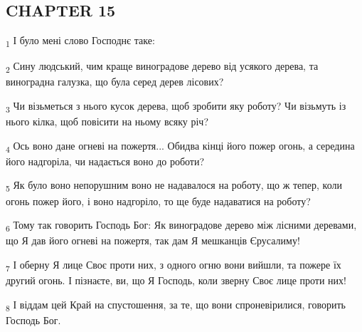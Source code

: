 \subsection{CHAPTER 15}
\begin{tcolorbox}
\textsubscript{1} І було мені слово Господнє таке:
\end{tcolorbox}
\begin{tcolorbox}
\textsubscript{2} Сину людський, чим краще виноградове дерево від усякого дерева, та виноградна галузка, що була серед дерев лісових?
\end{tcolorbox}
\begin{tcolorbox}
\textsubscript{3} Чи візьметься з нього кусок дерева, щоб зробити яку роботу? Чи візьмуть із нього кілка, щоб повісити на ньому всяку річ?
\end{tcolorbox}
\begin{tcolorbox}
\textsubscript{4} Ось воно дане огневі на пожертя... Обидва кінці його пожер огонь, а середина його надгоріла, чи надається воно до роботи?
\end{tcolorbox}
\begin{tcolorbox}
\textsubscript{5} Як було воно непорушним воно не надавалося на роботу, що ж тепер, коли огонь пожер його, і воно надгоріло, то ще буде надаватися на роботу?
\end{tcolorbox}
\begin{tcolorbox}
\textsubscript{6} Тому так говорить Господь Бог: Як виноградове дерево між лісними деревами, що Я дав його огневі на пожертя, так дам Я мешканців Єрусалиму!
\end{tcolorbox}
\begin{tcolorbox}
\textsubscript{7} І оберну Я лице Своє проти них, з одного огню вони вийшли, та пожере їх другий огонь. І пізнаєте, ви, що Я Господь, коли зверну Своє лице проти них!
\end{tcolorbox}
\begin{tcolorbox}
\textsubscript{8} І віддам цей Край на спустошення, за те, що вони спроневірилися, говорить Господь Бог.
\end{tcolorbox}

